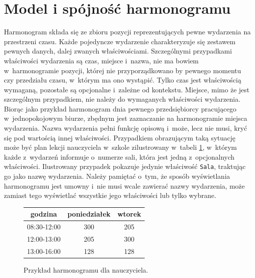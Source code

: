 \documentclass[a4paper]{book}
\begin{document}
\section{Model i spójność harmonogramu}
Harmonogram składa się ze zbioru pozycji reprezentujących pewne wydarzenia na przestrzeni czasu. Każde pojedyncze wydarzenie charakteryzuje się zestawem pewnych danych, dalej zwanych właściwościami. Szczególnymi przypadkami właściwości wydarzenia są czas, miejsce i~nazwa, nie ma bowiem w~harmonogramie pozycji, której nie przyporządkowano by pewnego momentu czy przedziału czasu, w~którym ma ono wystąpić. Tylko czas jest właściwością wymaganą, pozostałe są opcjonalne i~zależne od kontekstu. Miejsce, mimo że jest szczególnym przypadkiem, nie należy do wymaganych właściwości wydarzenia. Biorąc jako przykład harmonogram dnia pewnego przedsiębiorcy pracującego w~jednopokojowym biurze, zbędnym jest zaznaczanie na harmonogramie miejsca wydarzenia. Nazwa wydarzenia pełni funkcję opisową i~może, lecz nie musi, kryć się pod wartością innej właściwości. Przypadkiem obrazującym taką sytuację może być plan lekcji nauczyciela w~szkole zilustrowany w~tabeli \ref{id:fig:Nauczyciel}, w~którym każde z~wydarzeń informuje o~numerze sali, która jest jedną z~opcjonalnych właściwości. Ilustrowany przypadek pokazuje jedynie właściwość \lstinline|Sala|, traktując go jako nazwę wydarzenia. Należy pamiętać o~tym, że sposób wyświetlania harmonogramu jest umowny i~nie musi wcale zawierać nazwy wydarzenia, może zamiast tego wyświetlać wszystkie jego właściwości lub tylko wybrane.
\begin{figure}
\centering
\begin{tabular}{ccc}
	\toprule
	  godzina   & poniedziałek & wtorek \\
	\midrule
	08:30-12:00 & 300          & 205    \\
	12:00-13:00 & 205          & 300    \\
	13:00-16:00 & 128          & 128    \\
	\bottomrule
\end{tabular}
\caption{Przykład harmonogramu dla nauczyciela.}
\label{id:fig:Nauczyciel}
\end{figure}
\end{document}
